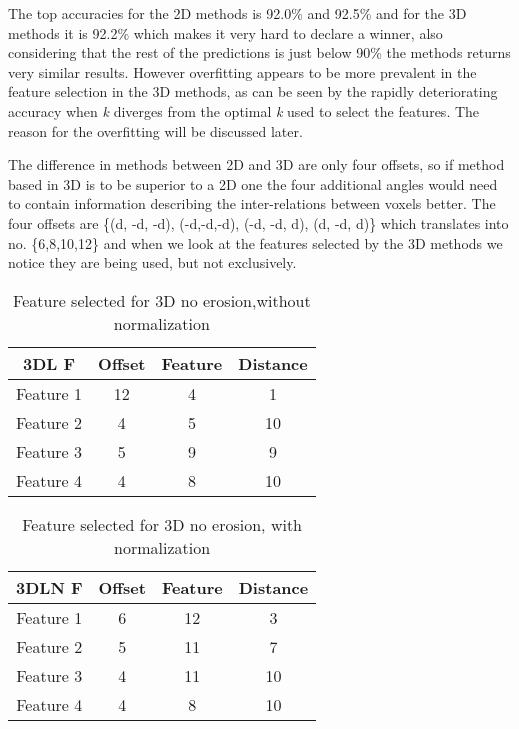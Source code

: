 The top accuracies for the 2D methods is 92.0\% and 92.5\% and for the 3D methods it is 92.2\% which makes it very hard to declare a winner, also considering that the rest of the predictions is just below 90\% the methods returns very similar results. However overfitting appears to be more prevalent in the feature selection in the 3D methods, as can be seen by the rapidly deteriorating accuracy when \emph{k} diverges from the optimal \emph{k} used to select the features. The reason for the overfitting will be discussed later.

The difference in methods between 2D and 3D are only four offsets, so if method based in 3D is to be superior to a 2D one the four additional angles would need to contain information describing the inter-relations between voxels better. The four offsets are \{(d, -d, -d), (-d,-d,-d), (-d, -d, d), (d, -d, d)\} which translates into no. \{6,8,10,12\} and when we look at the features selected by the 3D methods we notice they are being used, but not exclusively.
\begin{table}[H]
  \centering
    \begin{tabular}{|c|c|c|c|}
    \hline
    3DL F & Offset & Feature & Distance \\ \hline
    Feature 1 & 12    & 4     & 1 \\ \hline
    Feature 2 & 4     & 5     & 10 \\ \hline
    Feature 3 & 5     & 9     & 9 \\ \hline
    Feature 4 & 4     & 8     & 10 \\ \hline
    \end{tabular}%
 \caption{Feature selected for 3D no erosion,without normalization}\label{tab:3DL F}%
\end{table}%
\begin{table}[H]
  \centering
    \begin{tabular}{|c|c|c|c|}
     \hline
    3DLN F & Offset & Feature & Distance \\ \hline
    Feature 1 & 6     & 12    & 3 \\ \hline
    Feature 2 & 5     & 11    & 7 \\ \hline
    Feature 3 & 4     & 11    & 10 \\ \hline
    Feature 4 & 4     & 8     & 10 \\ \hline
    \end{tabular}%
 \caption{Feature selected for 3D no erosion, with normalization}\label{tab:3DLN F}%
\end{table}%


